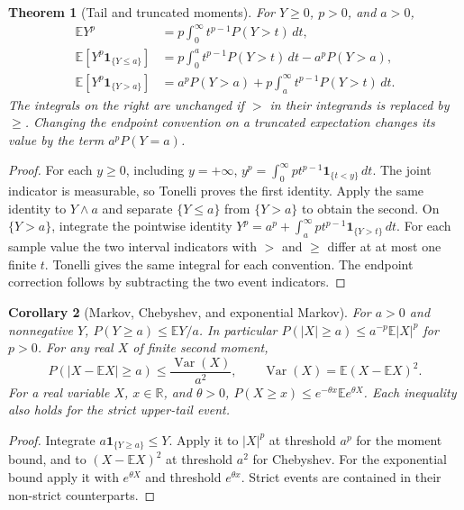 \documentclass[11pt,oneside,openany]{book}
\theoremstyle{plain}
\newtheorem{theorem}{Theorem}[chapter]
\newtheorem{corollary}[theorem]{Corollary}
\theoremstyle{definition}
\theoremstyle{remark}
\begin{document}
\begin{theorem}[Tail and truncated moments]
\label{thm:prob-tail}
For \(Y\ge0\), \(p>0\), and \(a>0\),
\begin{align*}
 \mathbb E Y^p &= p\int_0^\infty t^{p-1}P(Y>t)\,dt,\\
 \mathbb E[Y^p\mathbf 1_{\{Y\le a\}}]
   &=p\int_0^a t^{p-1}P(Y>t)\,dt-a^pP(Y>a),\\
 \mathbb E[Y^p\mathbf 1_{\{Y>a\}}]
   &=a^pP(Y>a)+p\int_a^\infty t^{p-1}P(Y>t)\,dt.
\end{align*}
The integrals on the right are unchanged if \(>\) in their integrands
is replaced by \(\ge\). Changing the endpoint
convention on a truncated expectation changes its value by the term
\(a^pP(Y=a)\).
\end{theorem}
\begin{proof}
For each \(y\ge0\), including \(y=+\infty\),
\(y^p=\int_0^\infty p t^{p-1}\mathbf 1_{\{t<y\}}\,dt\). The joint
indicator is measurable, so Tonelli proves the first identity. Apply
the same identity to \(Y\wedge a\) and separate \(\{Y\le a\}\) from
\(\{Y>a\}\) to obtain the second. On \(\{Y>a\}\), integrate the
pointwise identity \(Y^p=a^p+\int_a^\infty p t^{p-1}
\mathbf 1_{\{Y>t\}}\,dt\). For each sample value the two interval
indicators with \(>\) and \(\ge\) differ at at most one finite \(t\).
Tonelli gives the same integral for each convention. The endpoint
correction follows by subtracting the two event indicators.
\end{proof}

\begin{corollary}[Markov, Chebyshev, and exponential Markov]
\label{thm:prob-markov}
For \(a>0\) and nonnegative \(Y\), \(P(Y\ge a)\le \mathbb E Y/a\).
In particular \(P(|X|\ge a)\le a^{-p}\mathbb E|X|^p\) for \(p>0\).
For any real \(X\) of finite second moment,
\[
 P(\lvert X-\mathbb E X\rvert\ge a)
 \le \frac{\operatorname{Var}(X)}{a^2},
 \qquad \operatorname{Var}(X)=\mathbb E (X-\mathbb E X)^2 .
\]
For a real variable \(X\), \(x\in\mathbb R\), and \(\theta>0\),
\(P(X\ge x)\le e^{-\theta x}\mathbb E e^{\theta X}\).
Each inequality also holds for the strict upper-tail event.
\end{corollary}
\begin{proof}
Integrate \(a\mathbf 1_{\{Y\ge a\}}\le Y\). Apply it to
\(|X|^p\) at threshold \(a^p\) for the moment bound, and to
\((X-\mathbb E X)^2\) at threshold \(a^2\) for Chebyshev.
For the exponential bound apply it with \(e^{\theta X}\) and threshold
\(e^{\theta x}\). Strict events are contained in their non-strict
counterparts.
\end{proof}
\end{document}
